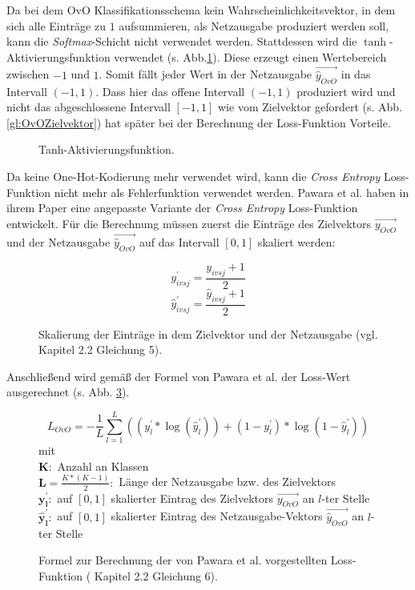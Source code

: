 Da bei dem OvO Klassifikationsschema kein Wahrscheinlichkeitsvektor, in dem sich alle Einträge zu $1$ aufsummieren, als Netzausgabe produziert werden soll, kann die \textit{Softmax}-Schicht nicht verwendet werden. Stattdessen wird die $\tanh$-Aktivierungsfunktion verwendet (s. Abb.\ref{fig:tanh}). Diese erzeugt einen Wertebereich zwischen $-1$ und $1$. Somit fällt jeder Wert in der Netzausgabe $\overrightarrow{\widehat{y}_{OvO}}$ in das Intervall $(-1, 1)$. Dass hier das offene Intervall $(-1, 1)$ produziert wird und nicht das abgeschlossene Intervall $[-1, 1]$ wie vom Zielvektor gefordert (s. Abb. \ref{gl:OvOZielvektor}) hat später bei der Berechnung der Loss-Funktion Vorteile.

\begin{figure}[H]
\begin{adjustbox}{width=.65\textwidth, center}

\end{adjustbox}
\caption{Tanh-Aktivierungsfunktion.}
\label{fig:tanh}
\end{figure}

Da keine One-Hot-Kodierung mehr verwendet wird, kann die \textit{Cross Entropy} Loss-Funktion nicht mehr als Fehlerfunktion verwendet werden. Pawara et al. haben in ihrem Paper \cite{pawaraPaper} eine angepasste Variante der \textit{Cross Entropy} Loss-Funktion entwickelt. Für die Berechnung müssen zuerst die Einträge des Zielvektors $\overrightarrow{y_{OvO}}$ und der Netzausgabe $\overrightarrow{\widehat{y}_{OvO}}$ auf das Intervall $[0, 1]$ skaliert werden:
\begin{figure}[H]
\[y_{ivsj}^{'} = \frac{y_{ivsj} + 1}{2}\]
\[\widehat{y}_{ivsj}^{'} = \frac{\widehat{y}_{ivsj} + 1}{2}\]
\caption{Skalierung der Einträge in dem Zielvektor und der Netzausgabe (vgl. \cite{pawaraPaper} Kapitel 2.2 Gleichung 5).}
\label{gl:pawaraSkalierung}
\end{figure}

Anschließend wird gemäß der Formel von Pawara et al. der Loss-Wert ausgerechnet (s. Abb. \ref{gl:pawaraLoss}).

\begin{figure}[H]
\[L_{OvO} = - \frac{1}{L} \sum_{l=1}^{L}((y_{l}^{'} * \log{(\widehat{y}_{l}^{'})}) + (1 - y_{l}^{'}) * \log{(1-\widehat{y}_{l}^{'})})\]
mit\\
$\boldsymbol{K}:$ Anzahl an Klassen\\

$\boldsymbol{L}=\frac{K*(K-1)}{2}:$ Länge der Netzausgabe bzw. des Zielvektors\\

$\boldsymbol{y_{l}^{'}}:$ auf $[0, 1]$ skalierter Eintrag des Zielvektors $\overrightarrow{y_{OvO}}$ an $l$-ter Stelle\\

$\boldsymbol{\widehat{y}_{l}^{'}}:$ auf $[0, 1]$ skalierter Eintrag des Netzausgabe-Vektors $\overrightarrow{\widehat{y}_{OvO}}$ an $l$-ter Stelle\\


\caption{Formel zur Berechnung der von Pawara et al. vorgestellten Loss-Funktion (\cite{pawaraPaper} Kapitel 2.2 Gleichung 6).}
\label{gl:pawaraLoss}
\end{figure}


